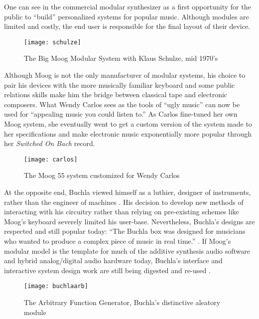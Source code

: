 One can see in the commercial modular synthesizer as a first opportunity for the public to ``build'' personalized systems for popular music. Although modules are limited and costly, the end user is responsible for the final layout of their device. 

	\begin{figure}[H]
	  \centering
	    \texttt{[image: schulze]}
	    \caption{The Big Moog Modular System with Klaus Schulze, mid 1970's}
	\end{figure}

Although Moog is not the only manufacturer of modular systems, his choice to pair his devices with the more musically familiar keyboard and some public relations skills make him the bridge between classical tape and electronic composers. What Wendy Carlos sees as the tools of ``ugly music'' can now be used for ``appealing music you could listen to.'' \cite[p.169]{holmes2002} As Carlos fine-tuned her own Moog system, she eventually went to get a custom version of the system made to her specifications and make electronic music exponentially more popular through her \textit{Switched On Bach} record. 

	\begin{figure}[H]
	  \centering
	    \texttt{[image: carlos]}
	    \caption{The Moog 55 system customized for Wendy Carlos}
	\end{figure}

At the opposite end, Buchla viewed himself as a luthier, designer of instruments, rather than the engineer of machines \citep{pinch2001}. His decision to develop new methods of interacting with his circuitry rather than relying on pre-existing schemes like Moog's keyboard severely limited his user-base. Nevertheless, Buchla's designs are respected and still popular today: ``The Buchla box was designed for musicians who wanted to produce a complex piece of music in real time.'' \citep[p47]{pinch2002}. If Moog's modular model is the template for much of the additive synthesis audio software and hybrid analog/digital audio hardware today, Buchla's interface and interactive system design work are still being digested and re-used \citep{rylan2015,snyder2012} . 

	\begin{figure}[H]
	  \centering
	    \texttt{[image: buchlaarb]}
	     \caption{The Arbitrary Function Generator, Buchla's distinctive aleatory module}
	\end{figure}

